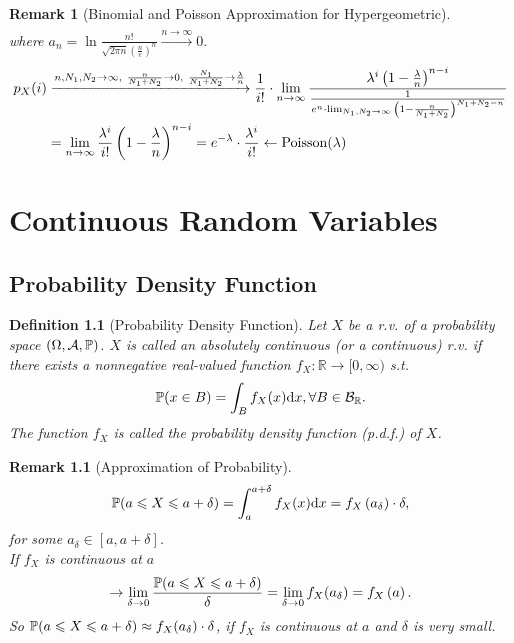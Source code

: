 \documentclass[openany,12pt]{book}
\newtheorem{remark}{Remark}[chapter]
\newtheorem{definition}{Definition}[chapter]
\begin{document}
\begin{remark}[Binomial and Poisson Approximation for Hypergeometric]
$$\begin{aligned}
    \end{aligned}
  $$
  where $a_n=\ln{\frac{n!}{\sqrt{2\pi n}\left(\frac{n}{e}\right)^n}}\xrightarrow{n\to\infty}0. $
  $$
    \begin{aligned}
      p_X(i) 
      &\xrightarrow{ n,N_1,N_2\to\infty,~\frac{n}{N_1+N_2}\to0,~\frac{N_1}{N_1+N_2}\to\frac{\lambda}{n}} \frac{1}{i!}\cdot\lim_{n\to\infty}{\frac{\lambda^i\left(1-\frac{\lambda}{n}\right)^{n-i}}{\frac{1}{e^n\cdot\lim_{N_1,N_2\to\infty}{\left(1-\frac{n}{N_1+N_2}\right)^{N_1+N_2-n}}}}} \\
      &=\lim_{n\to\infty}{\frac{\lambda^i}{i!}} \left(1-\frac{\lambda}{n}\right)^{n-i}=e^{-\lambda}\cdot\frac{\lambda^i}{i!} \leftarrow\mathrm{Poisson}(\lambda) \\
    \end{aligned}
  $$
\end{remark}

\chapter{Continuous Random Variables}
\section{Probability Density Function}

\begin{definition}[Probability Density Function]
  Let $X$ be a r.v. of a probability space $(\Omega,\mathcal{A},\mathbb{P})$. $X$ is called an absolutely continuous (or a continuous) r.v. if there exists a nonnegative real-valued function $f_X: \mathbb{R}\to[0,\infty)$ s.t.
  $$
    \mathbb{P}(x\in B)=\int_{B}{f_X(x)\mathrm{d} x}, \forall B\in \mathcal{B}_{\mathbb{R}}.
  $$
  The function $f_X$ is called the probability density function (p.d.f.) of $X$.
\end{definition}

\begin{remark}[Approximation of Probability]
  $$
    \mathbb{P}(a\leqslant X\leqslant a+\delta)=\int_{a}^{a+\delta}{f_X(x)\mathrm{d} x}=f_X\left(a_\delta\right)\cdot\delta,
  $$
  for some $a_\delta\in[a, a+\delta]$.\\
  If $f_X$ is continuous at $a$
  $$
    \to\lim_{\delta\to0}{\frac{\mathbb{P}(a\leqslant X\leqslant a+\delta)}{\delta}}=\lim_{\delta\to0}{f_X(a_\delta)}=f_X\left(a\right).
  $$
  So $\mathbb{P}(a\leqslant X\leqslant a+\delta)\approx f_X(a_\delta)\cdot\delta$, if $f_X$ is continuous at $a$ and $\delta$ is very small.
\end{remark}
\end{document}
